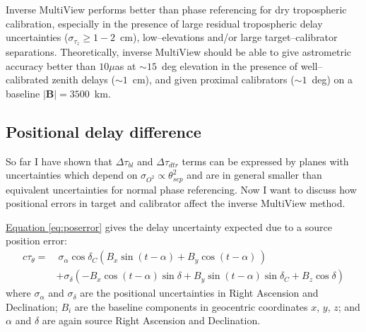 		Inverse MultiView performs better than phase referencing for dry tropospheric calibration, especially in the presence of large residual tropospheric delay uncertainties ($\sigma_{\tau_z}\ge1-2$~cm), low--elevations and/or large target--calibrator separations. Theoretically, inverse MultiView should be able to give astrometric accuracy better than $10\mu$as at $\sim15$~deg elevation in the presence of well--calibrated zenith delays ($\sim1$~cm), and given proximal calibrators ($\sim1$~deg) on a baseline $|\textbf{B}|=3500$~km.
	
	\subsection{Positional delay difference} \label{sec:positionerrorslope}
		So far I have shown that $\Delta \tau_{bl}$ and $\Delta \tau_{dtr}$ terms can be expressed by planes with uncertainties which depend on $\sigma_{O^2}\propto\theta_{sep}^2$ and are in general smaller than equivalent uncertainties for normal phase referencing. Now I want to discuss how positional errors in target and calibrator affect the inverse MultiView method.
		
		\hyperref[eq:poserror]{Equation \ref*{eq:poserror}} gives the delay uncertainty expected due to a source position error:
		\begin{align*}
		c\tau_{\theta} =&~ \sigma_{\alpha}\cos\delta_C(B_x\sin(t-\alpha)+B_y\cos(t-\alpha)\,)\\
			            &+ \sigma_{\delta}(-B_x\cos(t-\alpha)\sin\delta+B_y\sin(t-\alpha)\sin\delta_C+B_z\cos\delta) 
		\end{align*} where $\sigma_\alpha$ and $\sigma_\delta$ are the positional uncertainties in Right Ascension and Declination; $B_i$ are the baseline components in geocentric coordinates $x$, $y$, $z$; and $\alpha$ and $\delta$ are again source Right Ascension and Declination.
		
